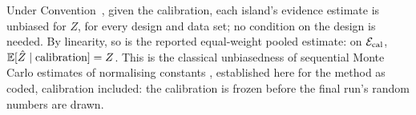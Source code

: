 
\begin{remark}\label{rem:unbiased}
Under Convention~, given the calibration, each island's evidence estimate is unbiased for $Z$, for every design and
data set; no condition
on the design is needed. By linearity, so is the reported equal-weight pooled estimate: on $\mathcal E_{\mathrm{cal}}$,
$\operatorname{\mathbb{E}}[\hat Z\mid\text{calibration}]=Z$. This is the classical unbiasedness of sequential Monte Carlo estimates of normalising
constants \citep{DelMoral2004}, established here for the method as coded, calibration included: the calibration is frozen
before the final run's random numbers are drawn.
\end{remark}

